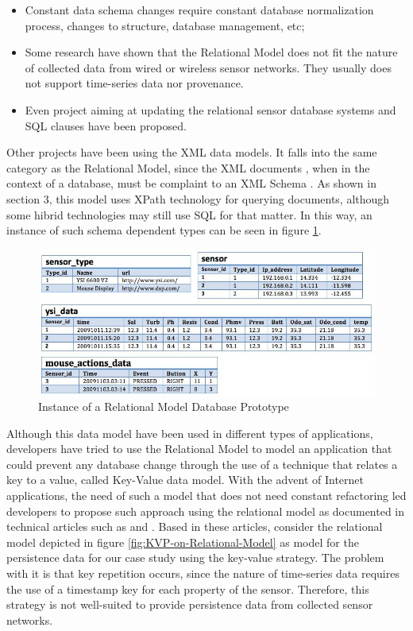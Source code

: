 \begin{itemize}
  \item Constant data schema changes require constant database normalization
  process, changes to structure, database management, etc;
  \item Some research have shown that the Relational Model does not fit the
  nature of collected data from wired or wireless sensor networks. They usually
  does not support time-series data nor provenance.
  \item Even project aiming at updating the relational sensor database systems
  and SQL clauses have been proposed. 
\end{itemize}

Other projects have been using the XML data models. It falls into the same
category as the Relational Model, since the XML documents \cite{xml}, when in
the context of a database, must be complaint to an XML Schema \cite{xml-schema}. As shown in
section 3, this model uses XPath \cite{xml-xpath} technology for querying
documents, although some hibrid technologies may still use SQL \cite{sql} for
that matter. In this way, an instance of such schema dependent types can be
seen in figure \ref{fig:persistence-example-relational}.

\begin{figure}[!h]
  \centering
  \includegraphics[scale=0.7]{../diagrams/persistence-example-relational}
  \caption{Instance of a Relational Model Database Prototype}
  \label{fig:persistence-example-relational}
\end{figure}

Although this data model have been used in different types of applications,
developers have tried to use the Relational Model to model an application that
could prevent any database change through the use of a technique that relates a
key to a value, called Key-Value data model. With the advent of Internet
applications, the need of such a model that does not need constant refactoring
led developers to propose such approach using the relational model as
documented in technical articles such as \cite{db-kvp-in-relational01} and
\cite{db-kvp-in-relational02}. Based in these articles, consider the relational
model depicted in figure \ref{fig:KVP-on-Relational-Model} as model for the
persistence data for our case study using the key-value strategy. The problem
with it is that key repetition occurs, since the nature of time-series data
requires the use of a timestamp key for each property of the sensor. Therefore,
this strategy is not well-suited to provide persistence data from collected
sensor networks.

